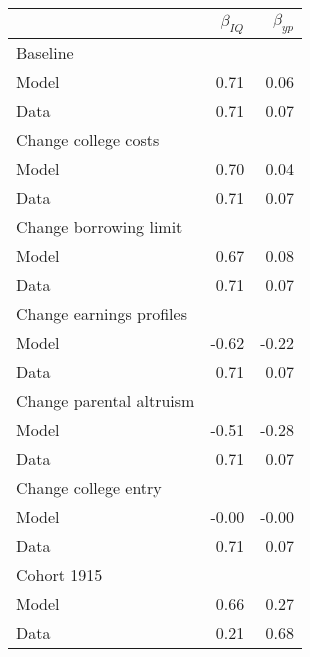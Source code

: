 \begin{tabular}{lrr}
\hline
  & $\beta_{IQ}$  & $\beta_{yp}$  \\ 
\hline
Baseline &   &   \\ 
Model & 0.71  & 0.06  \\ 
Data & 0.71  & 0.07  \\ 
Change college costs &   &   \\ 
Model & 0.70  & 0.04  \\ 
Data & 0.71  & 0.07  \\ 
Change borrowing limit &   &   \\ 
Model & 0.67  & 0.08  \\ 
Data & 0.71  & 0.07  \\ 
Change earnings profiles &   &   \\ 
Model & -0.62  & -0.22  \\ 
Data & 0.71  & 0.07  \\ 
Change parental altruism &   &   \\ 
Model & -0.51  & -0.28  \\ 
Data & 0.71  & 0.07  \\ 
Change college entry &   &   \\ 
Model & -0.00  & -0.00  \\ 
Data & 0.71  & 0.07  \\ 
Cohort 1915 &   &   \\ 
Model & 0.66  & 0.27  \\ 
Data & 0.21  & 0.68  \\ 
\hline
\end{tabular}%
